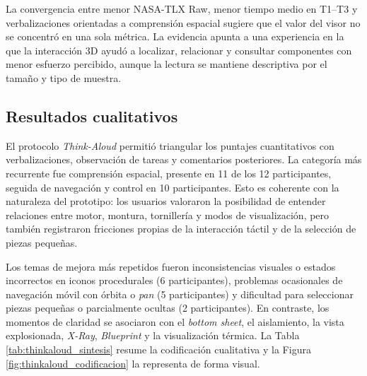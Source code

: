 La convergencia entre menor NASA-TLX Raw, menor tiempo medio en T1--T3 y verbalizaciones orientadas a comprensión espacial sugiere que el valor del visor no se concentró en una sola métrica. La evidencia apunta a una experiencia en la que la interacción 3D ayudó a localizar, relacionar y consultar componentes con menor esfuerzo percibido, aunque la lectura se mantiene descriptiva por el tamaño y tipo de muestra.

\subsection{Resultados cualitativos}

El protocolo \textit{Think-Aloud} permitió triangular los puntajes cuantitativos con verbalizaciones, observación de tareas y comentarios posteriores. La categoría más recurrente fue comprensión espacial, presente en 11 de los 12 participantes, seguida de navegación y control en 10 participantes. Esto es coherente con la naturaleza del prototipo: los usuarios valoraron la posibilidad de entender relaciones entre motor, montura, tornillería y modos de visualización, pero también registraron fricciones propias de la interacción táctil y de la selección de piezas pequeñas.

Los temas de mejora más repetidos fueron inconsistencias visuales o estados incorrectos en iconos procedurales (6 participantes), problemas ocasionales de navegación móvil con órbita o \textit{pan} (5 participantes) y dificultad para seleccionar piezas pequeñas o parcialmente ocultas (2 participantes). En contraste, los momentos de claridad se asociaron con el \textit{bottom sheet}, el aislamiento, la vista explosionada, \textit{X-Ray}, \textit{Blueprint} y la visualización térmica. La Tabla \ref{tab:thinkaloud_sintesis} resume la codificación cualitativa y la Figura \ref{fig:thinkaloud_codificacion} la representa de forma visual.

